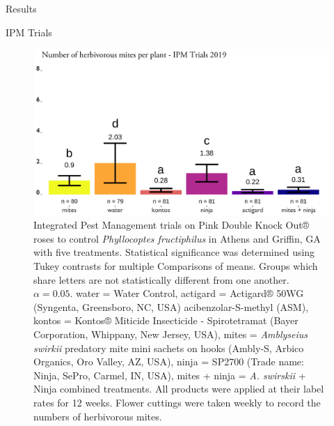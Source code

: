 \documentclass[
  ignorenonframetext,
]{beamer}
\begin{document}
\begin{frame}{Results}
\begin{block}{IPM Trials}
\protect\hypertarget{ipm-trials}{}
\begin{figure}
\includegraphics[width=0.8\linewidth]{figure/ipm_graph} \caption{Integrated Pest Management trials on Pink Double Knock Out® roses to control \textit{Phyllocoptes fructiphilus} in Athens and Griffin, GA with five treatments. Statistical significance was determined using Tukey contrasts for multiple Comparisons of means. Groups which share letters are not statistically different from one another. $\alpha = 0.05$. water = Water Control, actigard = Actigard® 50WG (Syngenta, Greensboro, NC, USA) acibenzolar-S-methyl (ASM), kontos = Kontos® Miticide Insecticide - Spirotetramat (Bayer Corporation, Whippany, New Jersey, USA), mites = \textit{Amblyseius swirkii} predatory mite mini sachets on hooks (Ambly-S, Arbico Organics, Oro Valley, AZ, USA), ninja = SP2700 (Trade name: Ninja\texttrademark, SePro, Carmel, IN, USA), mites + ninja = \textit{A. swirskii} + Ninja combined treatments. All products were applied at their label rates for 12 weeks. Flower cuttings were taken weekly to record the numbers of herbivorous mites.}\label{fig:ipm}
\end{figure}
\end{block}


\end{frame}
\end{document}
